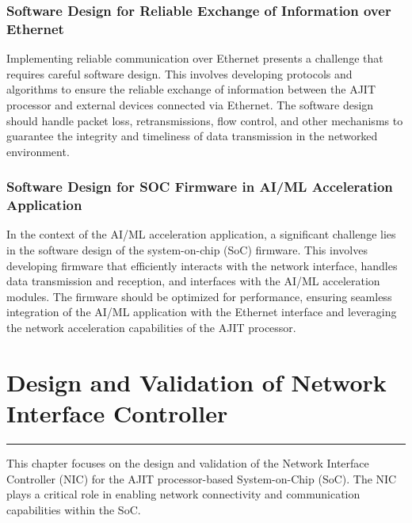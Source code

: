\documentclass[12pt]{report}
\begin{document}
		\subsection{Software Design for Reliable Exchange of Information over Ethernet}
   Implementing reliable communication over Ethernet presents a challenge that requires careful software design. This involves developing protocols and algorithms to ensure the reliable exchange of information between the AJIT processor and external devices connected via Ethernet. The software design should handle packet loss, retransmissions, flow control, and other mechanisms to guarantee the integrity and timeliness of data transmission in the networked environment.

		\subsection{Software Design for SOC Firmware in AI/ML Acceleration Application}
   In the context of the AI/ML acceleration application, a significant challenge lies in the software design of the system-on-chip (SoC) firmware. This involves developing firmware that efficiently interacts with the network interface, handles data transmission and reception, and interfaces with the AI/ML acceleration modules. The firmware should be optimized for performance, ensuring seamless integration of the AI/ML application with the Ethernet interface and leveraging the network acceleration capabilities of the AJIT processor.\\





\chapter{Design and Validation of Network Interface Controller} \label{2}
\rule[10pt]{\linewidth}{3pt}
This chapter focuses on the design and validation of the Network Interface Controller (NIC) for the AJIT processor-based System-on-Chip (SoC). The NIC plays a critical role in enabling network connectivity and communication capabilities within the SoC.
\end{document}
